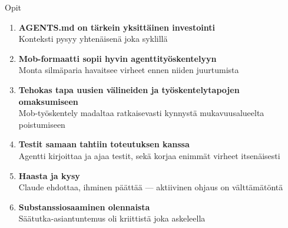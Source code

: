 \documentclass[aspectratio=169]{beamer}
\begin{document}
\begin{frame}{Opit}
  \begin{enumerate}
    \setlength{\itemsep}{0.7em}
    \item \textbf{AGENTS.md on tärkein yksittäinen investointi} \\
          Konteksti pysyy yhtenäisenä joka syklillä
    \item \textbf{Mob-formaatti sopii hyvin agenttityöskentelyyn} \\
          Monta silmäparia havaitsee virheet ennen niiden juurtumista
    \item \textbf{Tehokas tapa uusien välineiden ja työskentelytapojen omaksumiseen} \\
          Mob-työskentely madaltaa ratkaisevasti kynnystä mukavuusalueelta poistumiseen
    \item \textbf{Testit samaan tahtiin toteutuksen kanssa} \\
          Agentti kirjoittaa ja ajaa testit, sekä korjaa enimmät virheet itsenäisesti
    \item \textbf{Haasta ja kysy} \\
          Claude ehdottaa, ihminen päättää — aktiivinen ohjaus on välttämätöntä
    \item \textbf{Substanssiosaaminen olennaista} \\
          Säätutka-asiantuntemus oli kriittistä joka askeleella
  \end{enumerate}
\end{frame}
\end{document}
